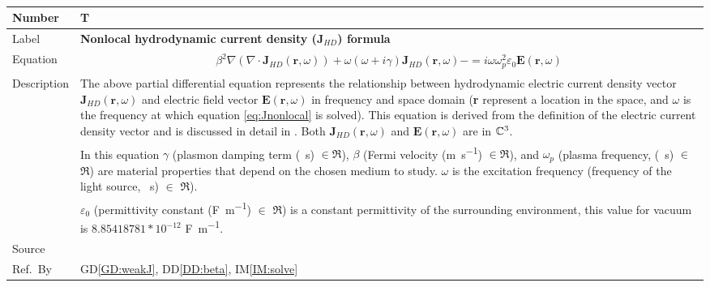 \documentclass[12pt]{article}
\newcommand{\colBwidth}{0.82\textwidth} \newcommand{\colCwidth}{0.1\textwidth}
\begin{document}
	~\newline \noindent \begin{minipage}{\textwidth}
		\renewcommand*{\arraystretch}{1.5} \begin{tabular}{| p{\colAwidth} |
				p{\colBwidth}|} \hline \rowcolor[gray]{0.9} Number&
			T{theorynum}\thetheorynum \label{TM:J}\\ \hline Label&\bf
			Nonlocal hydrodynamic current density (J$_{HD}$) formula \\ \hline Equation&
			\begin{equation} \label{eq:Jnonlocal} \begin{gathered} \beta^2 \nabla( \nabla
					\cdot \textbf{J}_{HD}(\textbf{r},\omega))	+ \omega ( \omega + i \gamma )
					\textbf{J}_{HD}(\textbf{r},\omega) - = i \omega \omega_p^2 \varepsilon_{0}
					\textbf{E}(\textbf{r},\omega) \end{gathered}  \end{equation} \\
			
			
			\hline Description & The above partial differential equation represents the
			relationship between hydrodynamic electric current density vector
			$\textbf{J}_{HD}(\textbf{r},\omega)$ and electric field vector
			$\textbf{E}(\textbf{r},\omega)$ in frequency and space domain (\textbf{r}
			represent a location in the space, and $\omega$ is the frequency at which
			equation \ref{eq:Jnonlocal} is solved). This equation is derived from the
			definition of the electric current density vector and is discussed in detail
			in \cite{hiremath2012numerical}. Both $\textbf{J}_{HD}(\textbf{r},\omega)$
			and $\textbf{E}(\textbf{r},\omega)$ are in $\Bbb C^3$.\\ & In this equation
			$\gamma$ (plasmon damping term (\si{\per \second}) $\in \Re$), $\beta$ (Fermi
			velocity (\si{\meter \per \second}) $\in \Re$), and $\omega_p$ (plasma
			frequency, (\si{\per \second}) $\in$ $\Re$) are material properties that
			depend on the chosen medium to study. $\omega$ is the excitation frequency
			(frequency of the light source, \si{\per \second}) $\in$ $\Re$). \\ &
			$\varepsilon_0$ (permittivity constant (\si{\farad \per \meter}) $\in$ $\Re$)
			is a constant permittivity of the surrounding environment, this value for
			vacuum is $8.85418781*10^{-12}$ \si{\farad \per \meter}. \\ \hline Source &
			\cite{hiremath2012numerical} \\ %
			\hline Ref.\ By & GD\ref{GD:weakJ}, DD\ref{DD:beta}, IM\ref{IM:solve}\\
			\hline \end{tabular} \end{minipage}\\
	
\end{document}
